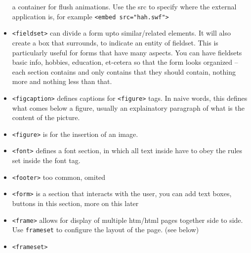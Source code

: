 \documentclass[oneside, 12pt]{article}
\newcommand{\itemm}[1]{\item \texttt{#1}}
\begin{document}
\begin{itemize}
	a container for flush animations. Use the src to specify where the external application is, for example
	\texttt{<embed src="hah.swf">}
	\itemm{<fieldset>} can divide a form upto similar/related elements. It will also create a box that
	surrounds, to indicate an entity of fieldset. This is particularly useful for forms that have many
	aspects. You can have fieldsets basic info, hobbies, education, et-cetera so that the form looks
	organized -- each section contains and only contains that they should contain, nothing more and 
	nothing less than that.
	\itemm{<figcaption>} defines captions for \texttt{<figure>} tags. In naive words, this defines
	what comes below a figure, usually an explainatory paragraph of what is the content of the picture.
	\itemm{<figure>} is for the insertion of an image.
	\itemm{<font>} defines a font section, in which all text inside have to obey the rules set inside
	the font tag.
	\itemm{<footer>} too common, omited
	\itemm{<form>} is a section that interacts with the user, you can add text boxes, buttons in this 
	section, more on this later
	\itemm{<frame>} allows for display of multiple htm/html pages together side to side. Use \texttt{frameset}
	to configure the layout of the page. (see below)
	\itemm{<frameset>} 
\end{itemize}
\end{document}
